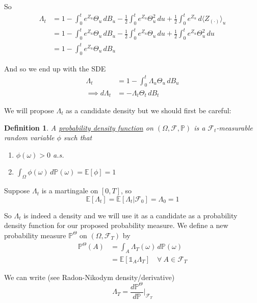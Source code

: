 \documentclass[12pt]{article}
\newtheorem{definition}{Definition}
\begin{document}
So
\begin{align*}
	\Lambda_t &= 1 - \int^t_0 e^{Z_u}\Theta_u\,dB_u - \frac{1}{2} \int^t_0 e^{Z_u}\Theta_u^2\,du + \frac{1}{2}\int^t_0 e^{Z_u} \,d\langle Z_{(\cdot)}\rangle_u \\
	&= 1 - \int^t_0 e^{Z_u}\Theta_u\,dB_u -  \frac{1}{2}\int^t_0 e^{Z_u} \Theta_u\,du + \frac{1}{2}\int^t_0 e^{Z_u}\Theta_u^2\,du \\
	&= 1 - \int^t_0 e^{Z_u}\Theta_u\,dB_u
\end{align*}

And so we end up with the SDE
\begin{align*}
	\Lambda_t &= 1 - \int^t_0\Lambda_u\Theta_u\,dB_u \\
	\implies d\Lambda_t &= -\Lambda_t\Theta_t\,dB_t
\end{align*}

We will propose $\Lambda_t$ as a candidate density but we should first be careful:
\begin{definition} A \underline{probability density function} on $(\Omega, \mathcal F,\mathbb P)$ is a $\mathcal F_t$-measurable random variable $\phi$ such that
\begin{enumerate}
	\item $\phi(\omega) > 0$ a.s.
	\item $\int_\Omega \phi(\omega)\,d\mathbb P(\omega) = \mathbb E[\phi] = 1$
\end{enumerate}
\end{definition}

Suppose $\Lambda_t$ is a martingale on $[0,T]$, so
\begin{equation*}
	\mathbb E[\Lambda_t] = \mathbb E[\Lambda_t|\mathcal F_0] = \Lambda_0 = 1
\end{equation*}

So $\Lambda_t$ is indeed a density and we will use it as a candidate as a probability density function for our proposed probability measure. We define a new probability measure $\mathbb P^\Theta$ on $(\Omega,\mathcal F_T)$ by
\begin{align*}
	\mathbb P^\Theta(A) &= \int_A \Lambda_T(\omega)\,d\mathbb P(\omega) \\
	&= \mathbb E[\mathds 1_A\Lambda_T] \quad \forall~A \in \mathcal F_T
\end{align*}

We can write (see Radon-Nikodym density/derivative)
\begin{equation*}
	\Lambda_T = \frac{d\mathbb P^\Theta}{d\mathbb P}\Bigg|_{\mathcal F_T}
\end{equation*}
\end{document}
